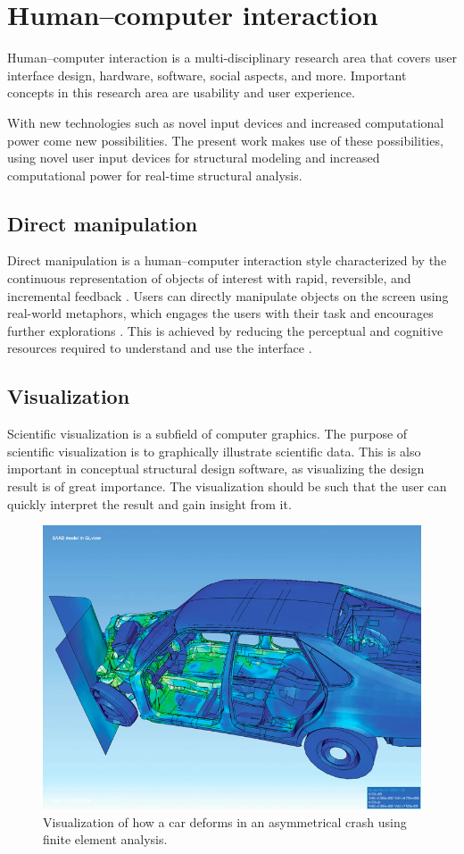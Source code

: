 \chapter{Human--computer interaction}
\label{ch:Human-computer interaction}
Human--computer interaction is a multi-disciplinary research area that covers user interface design, hardware, software, social aspects, and more. Important concepts in this research area are usability and user experience.

With new technologies such as novel input devices and increased computational power come new possibilities. The present work makes use of these possibilities, using novel user input devices for structural modeling and increased computational power for real-time structural analysis. 

\section{Direct manipulation}
Direct manipulation is a human--computer interaction style characterized by the continuous representation of objects of interest with rapid, reversible, and incremental feedback \cite{Shneiderman1982}. Users can directly manipulate objects on the screen using real-world metaphors, which engages the users with their task and encourages further explorations \cite{Shneiderman:1997:DMC:238218.238281}. This is achieved by reducing the perceptual and cognitive resources required to understand and use the interface \cite{Sears1990}.

\section{Visualization}
Scientific visualization is a subfield of computer graphics. The purpose of scientific visualization is to graphically illustrate scientific data. This is also important in conceptual structural design software, as visualizing the design result is of great importance. The visualization should be such that the user can quickly interpret the result and gain insight from it. 

\begin{figure}
  \includegraphics[width=320pt]{graphics/car.jpg}
  \caption{Visualization of how a car deforms in an asymmetrical crash using finite element analysis.}
  \label{fig:Car}
\end{figure}

